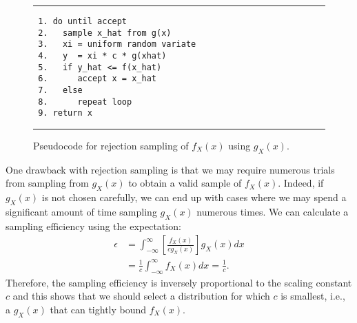 \begin{figure}[tb!]
\begin{center}
\noindent \rule{\textwidth}{1pt}
\begin{verbatim}
 1. do until accept
 2.   sample x_hat from g(x)
 3.   xi = uniform random variate
 4.   y  = xi * c * g(xhat)
 5.   if y_hat <= f(x_hat)
 6.      accept x = x_hat
 7.   else
 8.      repeat loop
 9. return x
\end{verbatim}
\rule{\textwidth}{1pt}
\caption{Pseudocode for rejection sampling of $f_X(x)$ using $g_X(x)$.}
\label{Fig:probability_rejectionAlgorithm}
\end{center}
\end{figure}

One drawback with rejection sampling is that we may require numerous trials from sampling from $g_X(x)$ to obtain a valid sample of $f_X(x)$. Indeed, if $g_X(x)$ is not chosen carefully, we can end up with cases where we may spend a significant amount of time sampling $g_X(x)$ numerous times. We can calculate a sampling efficiency using the expectation:
\begin{align}
  \epsilon &= \int_{-\infty}^\infty \left[ \frac{ f_X(x) }{ c g_X(x) } \right] g_X(x) dx \nonumber \\
           &= \frac{1}{c} \int_{-\infty}^\infty f_X(x) dx = \frac{1}{c} .
\end{align}
Therefore, the sampling efficiency is inversely proportional to the scaling constant $c$ and this shows that we should select a distribution for which $c$ is smallest, i.e., a $g_X(x)$ that can tightly bound $f_X(x)$.

